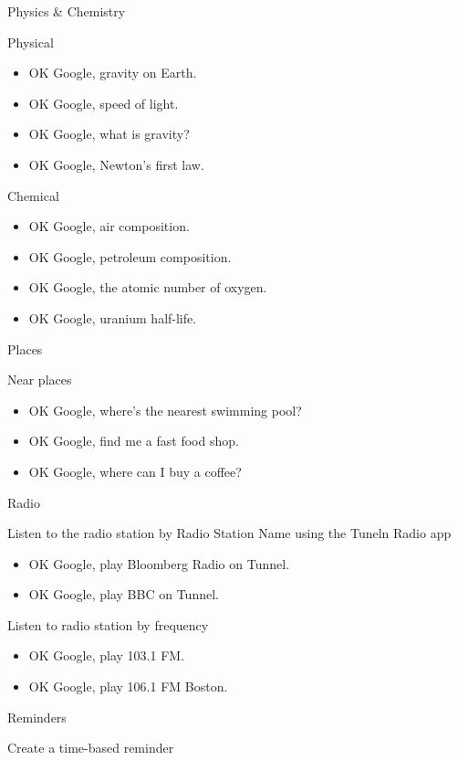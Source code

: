 \documentclass[
  letterpaper,
  DIV=11,
  numbers=noendperiod]{scrartcl}
\begin{document}
Physics \& Chemistry

Physical

\begin{itemize}
\item
  OK Google, gravity on Earth.
\item
  OK Google, speed of light.
\item
  OK Google, what is gravity?
\item
  OK Google, Newton's first law.
\end{itemize}

Chemical

\begin{itemize}
\item
  OK Google, air composition.
\item
  OK Google, petroleum composition.
\item
  OK Google, the atomic number of oxygen.
\item
  OK Google, uranium half-life.
\end{itemize}

Places

Near places

\begin{itemize}
\item
  OK Google, where's the nearest swimming pool?
\item
  OK Google, find me a fast food shop.
\item
  OK Google, where can I buy a coffee?
\end{itemize}

Radio

Listen to the radio station by Radio Station Name using the Tuneln Radio
app

\begin{itemize}
\item
  OK Google, play Bloomberg Radio on Tunnel.
\item
  OK Google, play BBC on Tunnel.
\end{itemize}

Listen to radio station by frequency

\begin{itemize}
\item
  OK Google, play 103.1 FM.
\item
  OK Google, play 106.1 FM Boston.
\end{itemize}

Reminders

Create a time-based reminder
\end{document}
